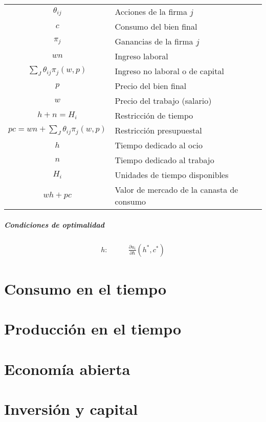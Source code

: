 \documentclass[8pt,a4paper]{extarticle}
\begin{document}
\begin{multicols}{3}
\begin{center}
\begin{tabular}{ c l }
	\hline
	$\theta_{ij}$								& Acciones de la firma $j$ \\
	$c$											& Consumo del bien final \\
	$\pi_j$										& Ganancias de la firma $j$ \\
	$wn$										& Ingreso laboral \\
	$\displaystyle \sum_J \theta_{ij} \pi_j (w,p)$			& Ingreso no laboral o de capital \\
	$p$											& Precio del bien final \\
	$w$											& Precio del trabajo (salario) \\
	$h + n = H_i$								& Restricción de tiempo \\
	$\displaystyle pc = wn + \sum_J \theta_{ij} \pi_j (w, p)$ & Restricción presupuestal \\
	$h$											& Tiempo dedicado al ocio \\
	$n$											& Tiempo dedicado al trabajo \\
	$H_i$										& Unidades de tiempo disponibles \\
	$wh + pc$									& Valor de mercado de la canasta de consumo \\
	\hline
\end{tabular}
\end{center}

\sectionbreak

\subsubsection*{Condiciones de optimalidad}

\begin{equation*}
\begin{aligned}
	h : \qquad & \frac{\partial u_i}{\partial h} (h^*, c^*)
\end{aligned}
\end{equation*}

\newpage

\part{Consumo en el tiempo}

\newpage

\part{Producción en el tiempo}

\newpage

\part{Economía abierta}

\newpage

\part{Inversión y capital}

\vfill\eject
\columnbreak
\end{multicols}
\end{document}
